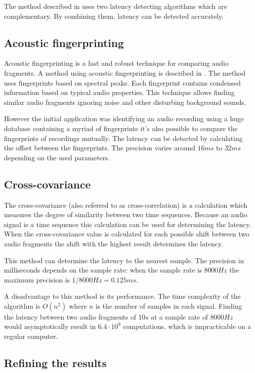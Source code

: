 \documentclass[twocolumn]{phdsymp} %
\begin{document}
The method described in \cite{six2015multimodal} uses two latency detecting algorithms which are complementary. By combining them, latency can be detected accurately.

\subsection{Acoustic fingerprinting}
Acoustic fingerprinting is a fast and robust technique for comparing audio fragments. A method using acoustic fingerprinting is described in \cite{Wang2003a}. The method uses fingerprints based on spectral peaks. Each fingerprint contains condensed information based on typical audio properties. This technique allows finding similar audio fragments ignoring noise and other disturbing background sounds. 

However the initial application was identifying an audio recording using a huge database containing a myriad of fingerprints it's also possible to compare the fingerprints of recordings mutually. The latency can be detected by calculating the offset between the fingerprints. The precision varies around $16ms$ to $32ms$ depending on the used parameters.

\subsection{Cross-covariance}
The cross-covariance (also referred to as cross-correlation) is a calculation which measures the degree of similarity between two time sequences. Because an audio signal is a time sequence this calculation can be used for determining the latency. When the cross-covariance value is calculated for each possible shift between two audio fragments the shift with the highest result determines the latency.

This method can determine the latency to the nearest sample. The precision in milliseconds depends on the sample rate: when the sample rate is $8000Hz$ the maximum precision is $ 1/8000 Hz = 0.125ms $.

A disadvantage to this method is its performance. The time complexity of the algorithm is $ O(n^2) $ where $ n $ is the number of samples in each signal. Finding the latency between two audio fragments of $10s$ at a sample rate of $8000Hz$ would asymptotically result in $ 6.4 \cdot 10^9 $ computations, which is impracticable on a regular computer.

\subsection{Refining the results}
\end{document}
